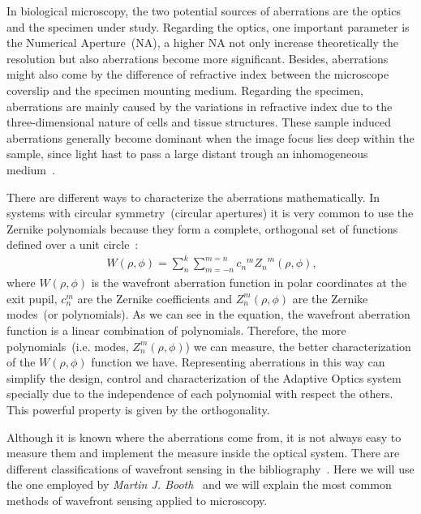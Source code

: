 In biological microscopy, the two potential sources of aberrations are the optics and the specimen under study. Regarding the optics, one important parameter is the Numerical Aperture~(NA), a higher NA not only increase theoretically the resolution but also aberrations become more significant. Besides, aberrations might also come by the difference of refractive index between the microscope coverslip and the specimen mounting medium. Regarding the specimen, aberrations are mainly caused by the variations in refractive index due to the three-dimensional nature of cells and tissue structures. These sample induced aberrations generally become dominant when the image focus lies deep within the sample, since light hast to pass a large distant trough an inhomogeneous medium~\cite{AOM_basic_ref}. 

There are different ways to characterize the aberrations mathematically. In systems with circular symmetry~(circular apertures) it is very common to use the Zernike polynomials because they form a complete, orthogonal set of functions defined over a unit circle~\cite{Zernike_original}:
\begin{align}
	\ W(\rho,\phi) = {\sum_{n}^{k}}{\sum_{m=-n}^{m=n}}{{c_n}^m {Z_n}^m}{(\rho,\phi)},
	\label{eq:aberration_zernike}
\end{align}
where $W(\rho,\phi)$ is the wavefront aberration function in polar coordinates at the exit pupil, $c_n^m$ are the Zernike coefficients and $Z_n^m (\rho,\phi)$ are the Zernike modes~(or polynomials). As we can see in the equation, the wavefront aberration function is a linear combination of polynomials. Therefore, the more polynomials~(i.e. modes, $Z_n^m (\rho,\phi)$) we can measure, the better characterization of the $W(\rho,\phi)$ function we have.
Representing aberrations in this way can simplify the design, control and characterization of the Adaptive Optics system specially due to the independence of each polynomial with respect the others. This powerful property is given by the orthogonality. 

Although it is known where the aberrations come from, it is not always easy to measure them and implement the measure inside the optical system. There are different classifications of wavefront sensing in the bibliography~\cite{AO_engineering_handbook}. Here we will use the one employed by \emph{Martin J. Booth}~\cite{AOM_basic_ref} and we will explain the most common methods of wavefront sensing applied to microscopy.     
     
